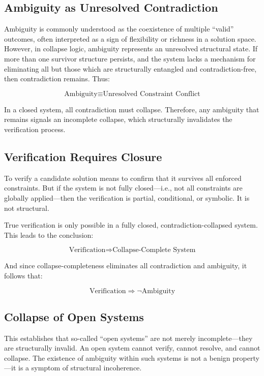 \documentclass[12pt]{article}
\begin{document}
\subsection{Ambiguity as Unresolved Contradiction}

Ambiguity is commonly understood as the coexistence of multiple “valid” outcomes, often interpreted as a sign of flexibility or richness in a solution space. However, in collapse logic, ambiguity represents an unresolved structural state. If more than one survivor structure persists, and the system lacks a mechanism for eliminating all but those which are structurally entangled and contradiction-free, then contradiction remains. Thus:

\[
\text{Ambiguity} \equiv \text{Unresolved Constraint Conflict}
\]

In a closed system, all contradiction must collapse. Therefore, any ambiguity that remains signals an incomplete collapse, which structurally invalidates the verification process.

\subsection{Verification Requires Closure}

To verify a candidate solution means to confirm that it survives all enforced constraints. But if the system is not fully closed—i.e., not all constraints are globally applied—then the verification is partial, conditional, or symbolic. It is not structural.

True verification is only possible in a fully closed, contradiction-collapsed system. This leads to the conclusion:

\[
\text{Verification} \Rightarrow \text{Collapse-Complete System}
\]

And since collapse-completeness eliminates all contradiction and ambiguity, it follows that:

\[
\text{Verification} \Rightarrow \neg \text{Ambiguity}
\]

\subsection{Collapse of Open Systems}

This establishes that so-called “open systems” are not merely incomplete—they are structurally invalid. An open system cannot verify, cannot resolve, and cannot collapse. The existence of ambiguity within such systems is not a benign property—it is a symptom of structural incoherence.
\end{document}
